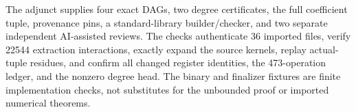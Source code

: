 The adjunct supplies four exact DAGs, two degree certificates, the full
coefficient tuple, provenance pins, a standard-library builder/checker,
and two separate independent AI-assisted reviews. The checks authenticate
36 imported files, verify 22544 extraction interactions, exactly expand the
source kernels, replay actual-tuple residues, and confirm all changed
register identities, the 473-operation ledger, and the nonzero degree head.
The binary and finalizer fixtures are finite implementation checks, not
substitutes for the unbounded proof or imported numerical theorems.
